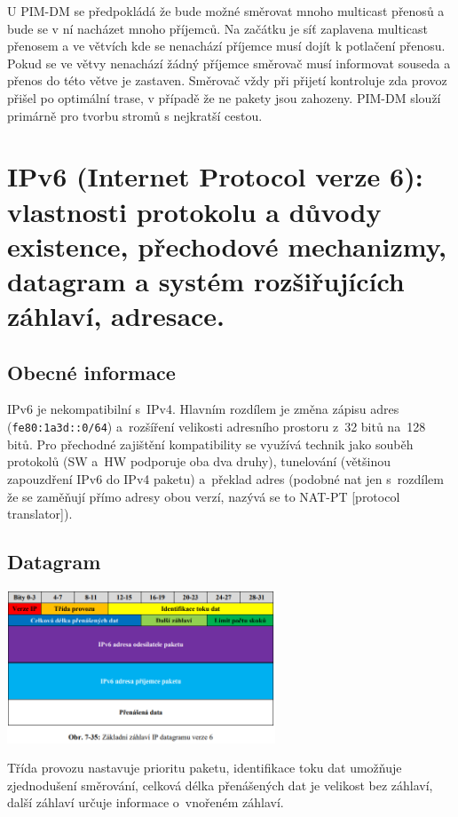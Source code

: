 U PIM-DM se předpokládá že bude možné směrovat mnoho multicast přenosů a bude se v ní nacházet mnoho příjemců.
Na začátku je síť zaplavena multicast přenosem a ve větvích kde se nenachází příjemce musí dojít k potlačení přenosu.
Pokud se ve větvy nenachází žádný příjemce směrovač musí informovat souseda a přenos do této větve je zastaven.
Směrovač vždy při přijetí kontroluje zda provoz přišel po optimální trase, v případě že ne pakety jsou zahozeny.
PIM-DM slouží primárně pro tvorbu stromů s nejkratší cestou.


\clearpage
\section{IPv6 (Internet Protocol verze 6): vlastnosti protokolu a důvody existence, přechodové mechanizmy, datagram a systém rozšiřujících záhlaví, adresace.}

\subsection{Obecné informace}

IPv6 je nekompatibilní s~IPv4.
Hlavním rozdílem je změna zápisu adres (\texttt{fe80:1a3d::0/64}) a~rozšíření velikosti adresního prostoru z~32 bitů na~128 bitů.
Pro přechodné zajištění kompatibility se využívá technik jako souběh protokolů (SW a~HW podporuje oba dva druhy), tunelování (většinou zapouzdření IPv6 do IPv4 paketu) a~překlad adres (podobné nat jen s~rozdílem že se zaměňují přímo adresy obou verzí, nazývá se to NAT-PT [protocol translator]).

\subsection{Datagram}
\begin{center}
	\includegraphics[width=0.6\textwidth]{obrazky/070.png}
\end{center}

Třída provozu nastavuje prioritu paketu, identifikace toku dat umožňuje zjednodušení směrování, celková délka přenášených dat je velikost bez záhlaví, další záhlaví určuje informace o~vnořeném záhlaví.

